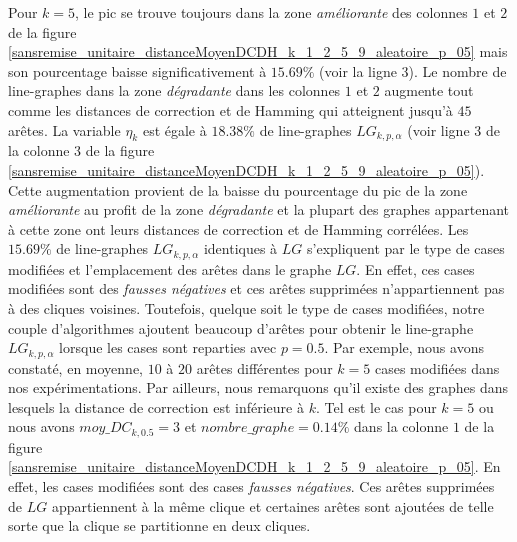 Pour $k = 5$, le pic se trouve toujours dans la zone {\em am\'eliorante} des colonnes $1$ et $2$ de la figure \ref{sansremise_unitaire_distanceMoyenDCDH_k_1_2_5_9_aleatoire_p_05} mais son pourcentage baisse significativement \`a $15.69\%$ (voir la ligne $3$). 
Le nombre de  line-graphes dans la zone {\em d\'egradante} dans les colonnes $1$ et $2$ augmente tout comme les distances de correction et de Hamming qui atteignent  jusqu'\`a $45$ ar\^etes.
La variable $\eta_k$ est \'egale \`a  $18.38\%$ de line-graphes $LG_{k,p,\alpha}$ (voir ligne $3$ de la colonne $3$ de la figure \ref{sansremise_unitaire_distanceMoyenDCDH_k_1_2_5_9_aleatoire_p_05}).
Cette augmentation provient de la baisse du pourcentage du pic de la zone {\em am\'eliorante} au profit de la zone {\em d\'egradante} et la plupart des graphes appartenant \`a cette zone ont leurs distances de correction et de Hamming corr\'el\'ees.
Les $15.69\%$  de line-graphes $LG_{k,p,\alpha}$ identiques \`a $LG$ s'expliquent par le type de cases modifi\'ees et l'emplacement des ar\^etes dans le graphe $LG$.  En effet, ces cases modifi\'ees sont des {\em fausses n\'egatives} et ces ar\^etes supprim\'ees n'appartiennent pas \`a des cliques voisines. Toutefois, quelque soit le type de cases modifi\'ees, notre couple d'algorithmes ajoutent beaucoup d'ar\^etes pour obtenir le line-graphe $LG_{k,p,\alpha}$ lorsque les cases sont reparties avec $p = 0.5$. Par exemple, nous avons constat\'e, en moyenne, $10$ \`a $20$ ar\^etes diff\'erentes pour $k=5$ cases modifi\'ees dans nos exp\'erimentations. 
Par ailleurs, nous remarquons qu'il existe des graphes dans lesquels la distance de correction est inf\'erieure \`a $k$. Tel est le cas pour $k = 5$ ou nous avons $moy\_DC_{k,0.5} = 3$ et $nombre\_graphe = 0.14\%$ dans la colonne $1$  de la figure \ref{sansremise_unitaire_distanceMoyenDCDH_k_1_2_5_9_aleatoire_p_05}.
En effet, les cases modifi\'ees sont des cases {\em fausses n\'egatives}. Ces ar\^etes supprim\'ees de $LG$ appartiennent \`a la m\^eme clique et certaines ar\^etes sont ajout\'ees de telle sorte que la clique se partitionne en deux cliques.   
\newline 

